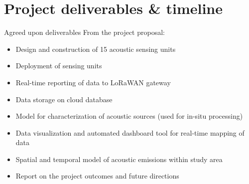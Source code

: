 \documentclass{beamer}
\begin{document}
\section{Project deliverables \& timeline}

    \begin{frame}{Agreed upon deliverables}
        From the project proposal:
        \begin{itemize} 
            \item Design and construction of 15 acoustic sensing units
            \item Deployment of sensing units
            \item Real-time reporting of data to LoRaWAN gateway
            \item Data storage on cloud database
            \item Model for characterization of acoustic sources (used for in-situ processing)
            \item Data visualization and automated dashboard tool for real-time mapping of data
            \item Spatial and temporal model of acoustic emissions within study area
            \item Report on the project outcomes and future directions
        \end{itemize}
    \end{frame}
\end{document}
